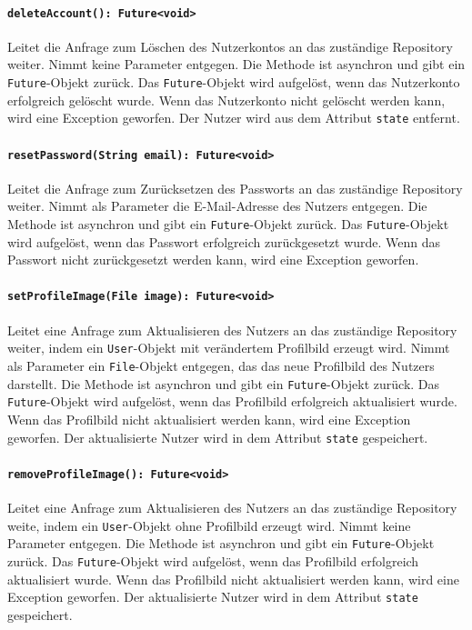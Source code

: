 \documentclass{entwurfsheft}
\begin{document}
\paragraph{\texttt{deleteAccount(): Future<void>}}
Leitet die Anfrage zum Löschen des Nutzerkontos an das zuständige Repository weiter. Nimmt keine Parameter entgegen. Die Methode ist asynchron und gibt ein \texttt{Future}-Objekt zurück. Das \texttt{Future}-Objekt wird aufgelöst, wenn das Nutzerkonto erfolgreich gelöscht wurde. Wenn das Nutzerkonto nicht gelöscht werden kann, wird eine Exception geworfen. Der Nutzer wird aus dem Attribut \texttt{state} entfernt.
\paragraph{\texttt{resetPassword(String email): Future<void>}}
Leitet die Anfrage zum Zurücksetzen des Passworts an das zuständige Repository weiter. Nimmt als Parameter die E-Mail-Adresse des Nutzers entgegen. Die Methode ist asynchron und gibt ein \texttt{Future}-Objekt zurück. Das \texttt{Future}-Objekt wird aufgelöst, wenn das Passwort erfolgreich zurückgesetzt wurde. Wenn das Passwort nicht zurückgesetzt werden kann, wird eine Exception geworfen.
\paragraph{\texttt{setProfileImage(File image): Future<void>}}
Leitet eine Anfrage zum Aktualisieren des Nutzers an das zuständige Repository weiter, indem ein \texttt{User}-Objekt mit verändertem Profilbild erzeugt wird. Nimmt als Parameter ein \texttt{File}-Objekt entgegen, das das neue Profilbild des Nutzers darstellt. Die Methode ist asynchron und gibt ein \texttt{Future}-Objekt zurück. Das \texttt{Future}-Objekt wird aufgelöst, wenn das Profilbild erfolgreich aktualisiert wurde. Wenn das Profilbild nicht aktualisiert werden kann, wird eine Exception geworfen. Der aktualisierte Nutzer wird in dem Attribut \texttt{state} gespeichert.
\paragraph{\texttt{removeProfileImage(): Future<void>}}
Leitet eine Anfrage zum Aktualisieren des Nutzers an das zuständige Repository weite, indem ein \texttt{User}-Objekt ohne Profilbild erzeugt wird. Nimmt keine Parameter entgegen. Die Methode ist asynchron und gibt ein \texttt{Future}-Objekt zurück. Das \texttt{Future}-Objekt wird aufgelöst, wenn das Profilbild erfolgreich aktualisiert wurde. Wenn das Profilbild nicht aktualisiert werden kann, wird eine Exception geworfen. Der aktualisierte Nutzer wird in dem Attribut \texttt{state} gespeichert.
\end{document}
